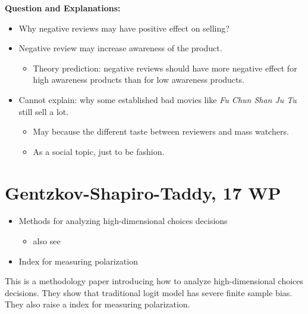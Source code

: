 \documentclass{book}
\theoremstyle{plain}
\theoremstyle{definition}
\begin{document}
\textbf{}

\vspace{1em}
\noindent
\textbf{Question and Explanations:}
\begin{itemize}
	\item Why negative reviews may have positive effect on selling?

	\item Negative review may increase awareness of the product.
	\begin{itemize}
		\item Theory prediction: negative reviews should have more negative effect for high awareness products than for low awareness products.
	\end{itemize}

	\item Cannot explain: why some established bad movies like \textit{Fu Chun Shan Ju Tu} still sell a lot.
	\begin{itemize}
		\item May because the different taste between reviewers and mass watchers.
		\item As a social topic, just to be fashion.
	\end{itemize}
\end{itemize}





\section{Gentzkov-Shapiro-Taddy, 17 WP} %
\label{sec:gentzkov_shapiro_taddy_17_wp}


\textbf{}

\begin{itemize}
	\item Methods for analyzing high-dimensional choices decisions
	\begin{itemize}
		\item also see 
	\end{itemize}
	\item Index for measuring polarization
\end{itemize}


This is a methodology paper introducing how to analyze high-dimensional choices decisions. They show that traditional logit model has severe finite sample bias.
They also raise a index for measuring polarization.
\end{document}
